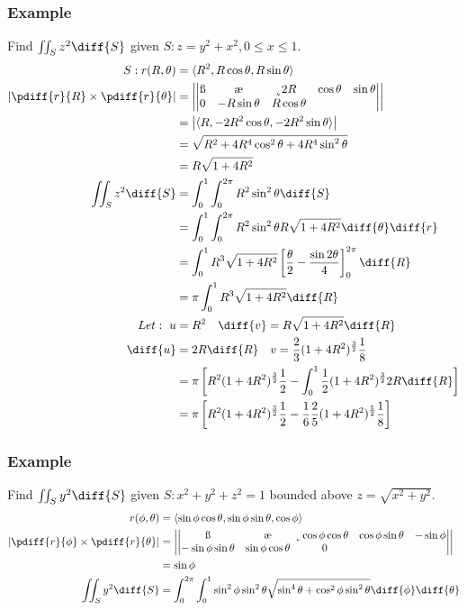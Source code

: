 \documentclass{math}
\begin{document}
\subsubsection*{Example}
Find \( \iint_{S}z^2\diff{S} \) given \( S:z=y^2+x^2, 0\le x\le1 \).
\begin{align*}
  S:r(R,\theta) &= \langle R^2,R\cos\theta, R\sin\theta\rangle \\
  \left|\pdiff{r}{R}\times\pdiff{r}{\theta}\right| &= \left|\begin{vmatrix}
    \i & \j & \k \\
    2R & \cos\theta & \sin\theta \\
    0 & -R\sin\theta & R\cos\theta
  \end{vmatrix}\right| \\
  &= \left|\langle R,-2R^2\cos\theta,-2R^2\sin\theta\rangle\right| \\
  &= \sqrt{R^2+4R^4\cos^2\theta+4R^4\sin^2\theta} \\
  &= R\sqrt{1+4R^2} \\
  \iint_{S}z^2\diff{S} &= \int_{0}^{1}\int_{0}^{2\pi}R^2\sin^2\theta\diff{S} \\
  &= \int_{0}^{1}\int_{0}^{2\pi}R^2\sin^2\theta R\sqrt{1+4R^2}
    \diff{\theta}\diff{r} \\
  &= \int_{0}^{1}R^3\sqrt{1+4R^2}
    \left[\frac{\theta}{2}-\frac{\sin2\theta}{4}\right]_{0}^{2\pi}\diff{R} \\
  &= \pi\int_{0}^{1}R^3\sqrt{1+4R^2}\diff{R} \\
  Let:~u &= R^2 \quad \diff{v} = R\sqrt{1+4R^2}\diff{R} \\
  \diff{u} &= 2R\diff{R} \quad
    v = \frac{2}{3}(1+4R^2)^{\frac{3}{2}}\frac{1}{8} \\
  &= \pi\left[R^2(1+4R^2)^{\frac{3}{2}}\frac{1}{2}-
    \int_{0}^{1}\frac{1}{2}(1+4R^2)^{\frac{3}{2}}2R\diff{R}\right] \\
  &= \pi\left[R^2(1+4R^2)^{\frac{3}{2}}\frac{1}{2}-
    \frac{1}{6}\frac{2}{5}(1+4R^2)^{\frac{5}{2}}\frac{1}{8}\right]
\end{align*}

\subsubsection*{Example}
Find \( \iint_{S}y^2\diff{S} \) given \( S:x^2+y^2+z^2 = 1 \) bounded above
\( z = \sqrt{x^2+y^2} \).
\begin{align*}
  r(\phi,\theta) &=
    \langle\sin\phi\cos\theta,\sin\phi\sin\theta,\cos\phi\rangle \\
  \left|\pdiff{r}{\phi}\times\pdiff{r}{\theta}\right| &= \left|\begin{vmatrix}
    \i & \j & \k \\
    \cos\phi\cos\theta & \cos\phi\sin\theta & -\sin\phi \\
    -\sin\phi\sin\theta & \sin\phi\cos\theta & 0
  \end{vmatrix}\right| \\
  &= \sin\phi \\
  \iint_{S}y^2\diff{S} &= \int_{0}^{2\pi}\int_{0}^{1}\sin^2\phi\sin^2\theta
    \sqrt{\sin^4\theta+\cos^2\phi\sin^2\theta}\diff{\phi}\diff{\theta}
\end{align*}
\end{document}
